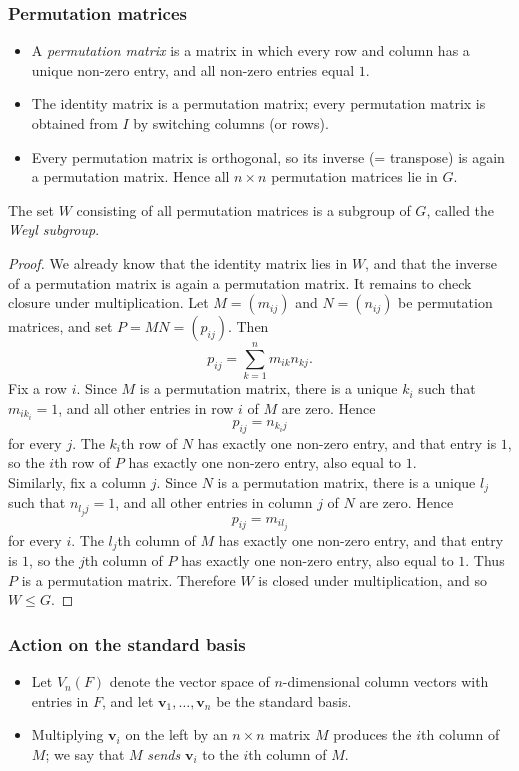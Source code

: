 \documentclass[../Odyssey_Project.tex]{subfiles}
\begin{document}
\subsubsection*{Permutation matrices}
\begin{itemize}
    \item A \emph{permutation matrix} is a matrix in which every row and column has a unique non-zero entry, and all non-zero entries equal $1$.
    \item The identity matrix is a permutation matrix; every permutation matrix is obtained from $I$ by switching columns (or rows).
    \item Every permutation matrix is orthogonal, so its inverse (= transpose) is again a permutation matrix. Hence all $n \times n$ permutation matrices lie in $G$.
\end{itemize}

\begin{proposition}
\label{prop:4.4}
The set $W$ consisting of all permutation matrices is a subgroup of $G$, called the \emph{Weyl subgroup}.
\end{proposition}

\begin{proof}
We already know that the identity matrix lies in $W$, and that the inverse of a permutation matrix is again a permutation matrix. It remains to check closure under multiplication. Let $M=(m_{ij})$ and $N=(n_{ij})$ be permutation matrices, and set $P=MN=(p_{ij})$. Then
\[
    p_{ij}=\sum_{k=1}^{n}m_{ik}n_{kj}.
\]
Fix a row $i$. Since $M$ is a permutation matrix, there is a unique $k_i$ such that $m_{ik_i}=1$, and all other entries in row $i$ of $M$ are zero. Hence
\[
    p_{ij}=n_{k_i j}
\]
for every $j$. The $k_i$th row of $N$ has exactly one non-zero entry, and that entry is $1$, so the $i$th row of $P$ has exactly one non-zero entry, also equal to $1$.\\
Similarly, fix a column $j$. Since $N$ is a permutation matrix, there is a unique $l_j$ such that $n_{l_jj}=1$, and all other entries in column $j$ of $N$ are zero. Hence
\[
    p_{ij}=m_{il_j}
\]
for every $i$. The $l_j$th column of $M$ has exactly one non-zero entry, and that entry is $1$, so the $j$th column of $P$ has exactly one non-zero entry, also equal to $1$. Thus $P$ is a permutation matrix. Therefore $W$ is closed under multiplication, and so $W \leq G$.
\end{proof}

\subsubsection*{Action on the standard basis}
\begin{itemize}
    \item Let $V_n(F)$ denote the vector space of $n$-dimensional column vectors with entries in $F$, and let $\mathbf{v}_1, \ldots, \mathbf{v}_n$ be the standard basis.
    \item Multiplying $\mathbf{v}_i$ on the left by an $n \times n$ matrix $M$ produces the $i$th column of $M$; we say that $M$ \emph{sends} $\mathbf{v}_i$ to the $i$th column of $M$.
\end{itemize}
\end{document}
